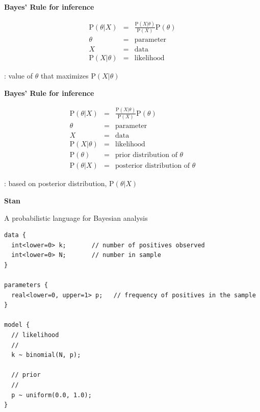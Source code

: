 \documentclass[titlepage,landscape,pdftex]{seminar}
\newcommand{\heading}[1]{{\color{red}\large\bf#1}}
\begin{document}
\begin{slide}
  \heading{Bayes' Rule for inference}

  \begin{eqnarray*}
    \mbox{P}(\theta|X) &=&
      \frac{\mbox{P}(X|\theta)}{\mbox{P}(X)}\mbox{P}(\theta) \\
    \theta &=& \mbox{parameter} \\
    X &=& \mbox{data} \\       
    \mbox{P}(X|\theta) &=& \mbox{likelihood}
  \end{eqnarray*}

: value of $\theta$ that
maximizes $\mbox{P}(X|\theta)$
  
  \vfill
  
\end{slide}

\begin{slide}
  \heading{Bayes' Rule for inference}

  \begin{eqnarray*}
    \mbox{P}(\theta|X) &=&
      \frac{\mbox{P}(X|\theta)}{\mbox{P}(X)}\mbox{P}(\theta) \\
    \theta &=& \mbox{parameter} \\
    X &=& \mbox{data} \\       
    \mbox{P}(X|\theta) &=& \mbox{likelihood} \\
    \mbox{P}(\theta) &=& \mbox{prior distribution of $\theta$} \\
    \mbox{P}(\theta|X) &=& \mbox{posterior distribution of $\theta$} 
  \end{eqnarray*}

  : based on posterior
  distribution, $\mbox{P}(\theta|X)$

  \vfill
  
\end{slide}

\begin{slide}
  \heading{Stan}

  \noindent A probabilistic language for Bayesian analysis

  {\tiny
\begin{verbatim}
data {
  int<lower=0> k;       // number of positives observed
  int<lower=0> N;       // number in sample
}

parameters {
  real<lower=0, upper=1> p;   // frequency of positives in the sample
}

model {
  // likelihood
  //
  k ~ binomial(N, p);

  // prior
  //
  p ~ uniform(0.0, 1.0);
}
\end{verbatim}
    }

\end{slide}
\end{document}
